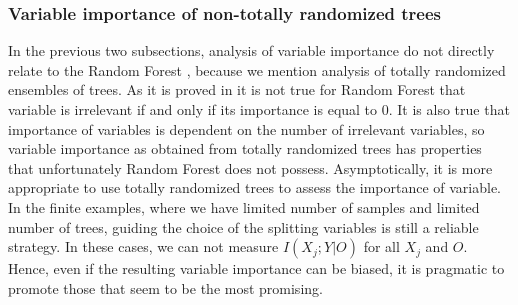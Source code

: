 \subsubsection{Variable importance of non-totally randomized trees}

In the previous two subsections, analysis of variable importance do not directly relate to the Random Forest \cite{breiman2001random}, because we mention analysis of totally randomized ensembles of trees. As it is proved in \cite{kohavi1997importance} it is not true for Random Forest that variable is irrelevant if and only if its importance is equal to 0. It is also true that importance of variables is dependent on the number of irrelevant variables, so variable importance as obtained from totally randomized trees has properties that unfortunately Random Forest does not possess. Asymptotically, it is more appropriate to use totally randomized trees to assess the importance of variable. In the finite examples, where we have limited number of samples and limited number of trees, guiding the choice of the splitting variables is still a reliable strategy. In these cases, we can not measure $I(X_j;Y|O)$ for all $X_j$ and $O$. Hence, even if the resulting variable importance can be biased, it is pragmatic to promote those that seem to be the most promising. 

